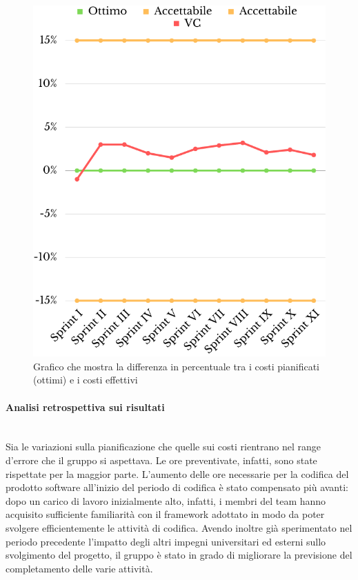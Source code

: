 \begin{figure}[H]
	\centering
	\includegraphics[scale=0.5]{img/CV2.png}
	\caption{Grafico che mostra la differenza in percentuale tra i costi pianificati (ottimi) e i costi effettivi}
\end{figure}
\paragraph{Analisi retrospettiva sui risultati}\mbox{}\\
Sia le variazioni sulla pianificazione che quelle sui costi rientrano nel range d'errore che il gruppo si aspettava. 
Le ore preventivate, infatti, sono state rispettate per la maggior parte. L'aumento delle ore necessarie per la codifica del prodotto software all'inizio del periodo di codifica è stato compensato più avanti: dopo un carico di lavoro inizialmente alto, infatti, i membri del team hanno acquisito sufficiente familiarità con il framework adottato in modo da poter svolgere efficientemente le attività di codifica.
Avendo inoltre già sperimentato nel periodo precedente l'impatto degli altri impegni universitari ed esterni sullo svolgimento del progetto, il gruppo è stato in grado di migliorare la previsione del completamento delle varie attività.

